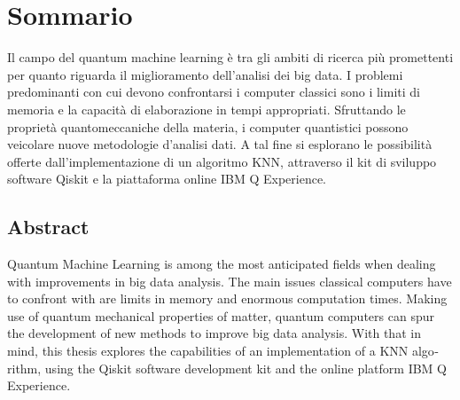 \begingroup
\let\clearpage\relax
\let\cleardoublepage\relax
\let\cleardoublepage\relax

\chapter*{Sommario}
Il campo del quantum machine learning è tra gli ambiti di ricerca più 
promettenti per quanto riguarda il miglioramento dell'analisi dei big data. 
I problemi predominanti con cui devono confrontarsi i computer classici sono i 
limiti di memoria e la capacità di elaborazione in tempi appropriati.
Sfruttando le proprietà quantomeccaniche della materia, i computer quantistici 
possono veicolare nuove metodologie d'analisi dati. 
A tal fine si esplorano le possibilità offerte dall'implementazione di un algoritmo KNN, 
attraverso il kit di sviluppo software Qiskit e la piattaforma online IBM Q Experience. 

\vfill

\begin{otherlanguage}{english}
\chapter*{Abstract}
Quantum Machine Learning is among the most anticipated fields when dealing 
with improvements in big data analysis. 
The main issues classical computers have to confront with are limits in memory 
and enormous computation times. 
Making use of quantum mechanical properties of matter, quantum computers can
spur the development of new methods to improve big data analysis. 
With that in mind, this thesis explores the capabilities of an implementation of a KNN 
algorithm, using the Qiskit software development kit and the online platform IBM Q Experience. 
\end{otherlanguage}

\endgroup

\vfill
